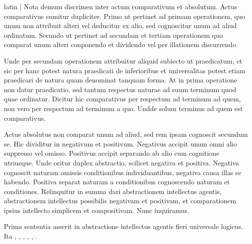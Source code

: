 \begin{otherlanguage*}{latin}
\pstart
  \textnormal{|} Nota demum discrimen inter actum comparativum et absolutum. Actus comparativus sumitur dupliciter. Primo ut pertinet ad primam operationem, quo unum non attribuit alteri vel deducitur ex alio, sed cognoscitur unum ad aliud ordinatum. Secundo ut pertinet ad secundam et tertiam operationem quo comparat unum alteri conponendo et dividendo vel per illationem discurrendo. 
\pend

\pstart
  Unde per secundam operationem attribuitur aliquid subiecto ut praedicatum, et sic per hanc potest natura praedicati de inferioribus et universalitas potest etiam praedicari de natura quam denominat tanquam forma. At in prima operatione non datur praedicatio, sed tantum respectus naturae ad suum terminum quod quae ordinatur. Dicitur hic comparativus per respectum ad terminum ad quem, non vero per respectum ad terminum a quo. Undde solum terminus ad quem est comparativus. 
\pend

\pstart
  Actus absolutus non comparat unum ad aliud, sed rem ipsam cognoscit secundum se. Hic dividitur in negativum et positivum. Negativus accipit unum omni alio suppresso vel omisso. Positivus accipit separando ab alio cum cognitione utriusque. Unde oritur duplex abstractio, scilicet negativa et positiva. Negativa cognoscit naturam omissis conditionibus individuantibus, negativa causa illas se habendo. Positiva separat naturam a conditionibus cognoscendo naturam et conditiones. Relinquitur in summa dari abstractionem intellectus agentis, abstractionem intellectus possibilis negativam et positivam, et comparationem ipsius intellecto simplicem et compositivam. Nunc inquiramus. 
\pend

        \pstart
        \pend
      
\pstart
  Prima sententia asserit in abstractione intellectus agentis fieri universale logicus. Ita , , , , , . 
\pend


\end{otherlanguage*}
